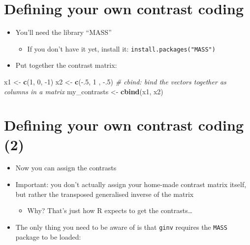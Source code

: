 \documentclass[]{article}
\newenvironment{Shaded}{}{}
\newcommand{\KeywordTok}[1]{\textcolor[rgb]{0.00,0.44,0.13}{\textbf{{#1}}}}
\newcommand{\DecValTok}[1]{\textcolor[rgb]{0.25,0.63,0.44}{{#1}}}
\newcommand{\StringTok}[1]{\textcolor[rgb]{0.25,0.44,0.63}{{#1}}}
\newcommand{\CommentTok}[1]{\textcolor[rgb]{0.38,0.63,0.69}{\textit{{#1}}}}
\newcommand{\NormalTok}[1]{{#1}}
\begin{document}
\section{Defining your own contrast
coding}\label{defining-your-own-contrast-coding}

\begin{itemize}
\itemsep1pt\parskip0pt
\item
  You'll need the library ``MASS''

  \begin{itemize}
  \itemsep1pt\parskip0pt
  \item
    If you don't have it yet, install it:
    \texttt{install.packages("MASS")}
  \end{itemize}
\item
  Put together the contrast matrix:
\end{itemize}

\begin{Shaded}
\begin{Highlighting}[]
\NormalTok{x1 <-}\StringTok{ }\KeywordTok{c}\NormalTok{(}\DecValTok{1}\NormalTok{, }\DecValTok{0}\NormalTok{, -}\DecValTok{1}\NormalTok{)}
\NormalTok{x2 <-}\StringTok{ }\KeywordTok{c}\NormalTok{(-.}\DecValTok{5}\NormalTok{, }\DecValTok{1} \NormalTok{, -.}\DecValTok{5}\NormalTok{)}
\CommentTok{# cbind: bind the vectors together as columns in a matrix}
\NormalTok{my_contrasts <-}\StringTok{ }\KeywordTok{cbind}\NormalTok{(x1, x2)}
\end{Highlighting}
\end{Shaded}

\section{Defining your own contrast coding
(2)}\label{defining-your-own-contrast-coding-2}

\begin{itemize}
\itemsep1pt\parskip0pt
\item
  Now you can assign the contrasts
\item
  Important: you don't actually assign your home-made contrast matrix
  itself, but rather the transposed generalised inverse of the matrix

  \begin{itemize}
  \itemsep1pt\parskip0pt
  \item
    Why? That's just how R expects to get the contrasts\ldots{}
  \end{itemize}
\item
  The only thing you need to be aware of is that \texttt{ginv} requires
  the \texttt{MASS} package to be loaded:
\end{itemize}
\end{document}
